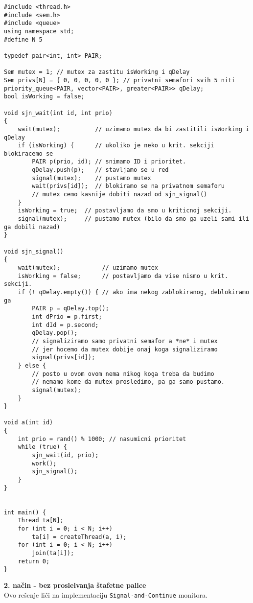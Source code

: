 \begin{lstlisting}
#include <thread.h>
#include <sem.h>
#include <queue>
using namespace std;
#define N 5

typedef pair<int, int> PAIR;

Sem mutex = 1; // mutex za zastitu isWorking i qDelay
Sem privs[N] = { 0, 0, 0, 0, 0 }; // privatni semafori svih 5 niti
priority_queue<PAIR, vector<PAIR>, greater<PAIR>> qDelay;
bool isWorking = false;

void sjn_wait(int id, int prio)
{
    wait(mutex);          // uzimamo mutex da bi zastitili isWorking i qDelay
    if (isWorking) {      // ukoliko je neko u krit. sekciji blokiracemo se
        PAIR p(prio, id); // snimamo ID i prioritet.
        qDelay.push(p);   // stavljamo se u red
        signal(mutex);    // pustamo mutex
        wait(privs[id]);  // blokiramo se na privatnom semaforu
        // mutex cemo kasnije dobiti nazad od sjn_signal()
    } 
    isWorking = true;  // postavljamo da smo u kriticnoj sekciji.
    signal(mutex);     // pustamo mutex (bilo da smo ga uzeli sami ili ga dobili nazad)
}

void sjn_signal() 
{
    wait(mutex);            // uzimamo mutex
    isWorking = false;      // postavljamo da vise nismo u krit. sekciji.  
    if (! qDelay.empty()) { // ako ima nekog zablokiranog, deblokiramo ga
        PAIR p = qDelay.top();
        int dPrio = p.first;
        int dId = p.second;
        qDelay.pop();
        // signaliziramo samo privatni semafor a *ne* i mutex
        // jer hocemo da mutex dobije onaj koga signaliziramo
        signal(privs[id]);
    } else {
        // posto u ovom ovom nema nikog koga treba da budimo
        // nemamo kome da mutex prosledimo, pa ga samo pustamo.
        signal(mutex); 
    }
}

void a(int id) 
{
    int prio = rand() % 1000; // nasumicni prioritet
    while (true) {
        sjn_wait(id, prio);
        work();
        sjn_signal();
    }
}


int main() {
    Thread ta[N];
    for (int i = 0; i < N; i++)
        ta[i] = createThread(a, i);
    for (int i = 0; i < N; i++)
		join(ta[i]);
    return 0;
}

\end{lstlisting}
\textbf{\large 2. na\v{c}in - bez prosle\dj{}ivanja \v{s}tafetne palice} \\
Ovo re\v{s}enje li\v{c}i na implementaciju \texttt{Signal-and-Continue} monitora.
